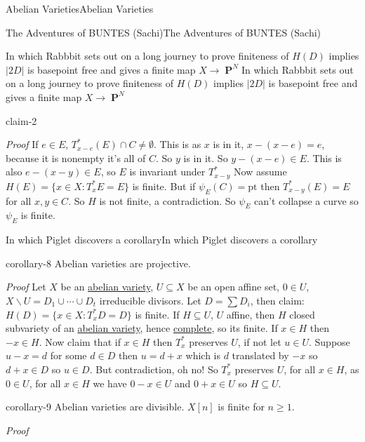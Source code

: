 \documentclass[10pt,]{book}
\makeatletter
\renewcommand*{\proofname}{Proof}
\renewenvironment{proof}[1][\proofname]{\par
  \pushQED{\qed}%
  \normalfont \topsep6\p@\@plus6\p@\relax
  \trivlist
  \item\relax
    {\itshape
    #1\@addpunct{.}}\hspace\labelsep\ignorespaces
}{%
  \popQED\endtrivlist\@endpefalse
}
\numberwithin{equation}{section}
\DeclareMathOperator{\PP}{\mathbf{P}}
\makeatother
\begin{document}
\begin{chapterptx}{Abelian Varieties}{}{Abelian Varieties}{}{}
\begin{sectionptx}{The Adventures of BUNTES (Sachi)}{}{The Adventures of BUNTES (Sachi)}{}{}
\begin{subsectionptx}{In which Rabbbit sets out on a long journey to prove finiteness of \(H(D)\) implies \(|2D|\) is basepoint free and gives a finite map \(X \to \PP^N\)}{}{In which Rabbbit sets out on a long journey to prove finiteness of \(H(D)\) implies \(|2D|\) is basepoint free and gives a finite map \(X \to \PP^N\)}{}{}
\begin{claim}{}{}{claim-2}
\end{claim}
\begin{proof}\hypertarget{proof-28}{}
\hypertarget{p-153}{}%
If \(e \in E\), \(T_{x-e}^*(E) \cap C \ne \emptyset\). This is as \(x\) is in it, \(x-(x-e) =e\), because it is nonempty it's all of \(C\). So \(y\) is in it. So \(y- (x-e) \in E\). This is also \(e - (x-y) \in E\), so \(E\) is invariant under \(T^*_{x-y}\)%
\end{proof}
\hypertarget{p-154}{}%
Now assume \(H(E) = \{x\in X: T_x^*E  = E \}\) is finite. But if \(\psi_E(C) = \text{pt}\) then \(T_{x-y}^*(E)  = E\) for all \(x,y\in C\). So \(H\) is not finite, a contradiction. So \(\psi_E\) can't collapse a curve so \(\psi_E\) is finite.%
\end{subsectionptx}
%
%
\typeout{************************************************}
\typeout{************************************************}
%
\begin{subsectionptx}{In which Piglet discovers a corollary}{}{In which Piglet discovers a corollary}{}{}\label{subsection-17}
\begin{corollary}{}{}{corollary-8}%
\hypertarget{p-155}{}%
Abelian varieties are projective.%
\end{corollary}
\begin{proof}\hypertarget{proof-29}{}
\hypertarget{p-156}{}%
Let \(X\) be an \hyperref[def-buntes-abvar]{abelian variety}, \(U \subseteq X\) be an open affine set, \(0\in U\), \(X\smallsetminus U = D_1 \cup \cdots \cup D_t\) irreducible divisors. Let \(D = \sum D_i\), then claim: \(H(D) = \{x\in X: T_x^*D  = D \}\) is finite. If \(H\subseteq U\), \(U\) affine, then \(H\) closed subvariety of an \hyperref[def-buntes-abvar]{abelian variety}, hence \hyperref[def-abelian-complete-var]{complete}, so its finite. If \(x\in H\) then \(-x \in H\). Now claim that if \(x\in H\) then \(T_x^*\) preserves \(U\), if not let \(u\in U\). Suppose \(u-x = d\) for some \(d\in D\) then \(u = d+x\) which is \(d\) translated by \(-x\) so \(d+x \in D\) so \(u\in D\). But contradiction, oh no! So \(T_x^*\) preserves \(U\), for all \(x\in H\), as \(0 \in U\), for all \(x\in H\) we have \(0-x \in U\) and  \(0+x\in U\) so \(H\subseteq U\).%
\end{proof}
\begin{corollary}{}{}{corollary-9}%
\hypertarget{p-157}{}%
Abelian varieties are divisible. \(X[n]\) is finite for \(n\ge 1\).%
\end{corollary}
\begin{proof}\hypertarget{proof-30}{}

\end{proof}
\end{subsectionptx}
\end{sectionptx}
\end{chapterptx}
\end{document}
